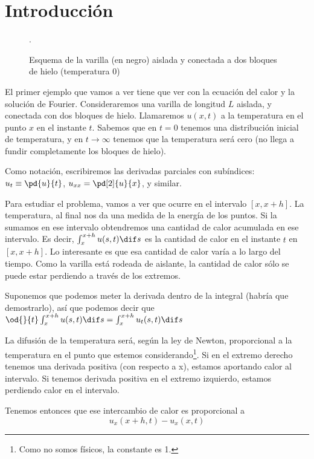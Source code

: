 \chapter{Introducción}

\begin{figure}[hbtp]
\centering
{}
\caption{Esquema de la varilla (en negro) aislada y conectada a dos bloques de hielo (temperatura 0)}.
\label{fig:TransmisionCalor}
\end{figure}

El primer ejemplo que vamos a ver tiene que ver con la ecuación del calor y la solución de Fourier. Consideraremos una varilla de longitud $L$ aislada, y conectada con dos bloques de hielo. Llamaremos $u(x,t)$ a la temperatura en el punto $x$ en el instante $t$. Sabemos que en $t = 0$ tenemos una distribución inicial de temperatura, y en $t \to ∞$ tenemos que la temperatura será cero (no llega a fundir completamente los bloques de hielo).

Como notación, escribiremos las derivadas parciales con subíndices: $u_t \equiv \pd{u}{t}$, $u_{xx} = \pd[2]{u}{x}$, y similar.

Para estudiar el problema, vamos a ver que ocurre en el intervalo $[x, x+h]$. La temperatura, al final nos da una medida de la energía de los puntos. Si la sumamos en ese intervalo obtendremos una cantidad de calor acumulada en ese intervalo. Es decir, $\int_x^{x+h} u(s,t) \dif s$ es la cantidad de calor en el instante $t$ en $[x,x+h]$. Lo interesante es que esa cantidad de calor varía a lo largo del tiempo. Como la varilla está rodeada de aislante, la cantidad de calor sólo se puede estar perdiendo a través de los extremos.

Suponemos que podemos meter la derivada dentro de la integral (habría que demostrarlo), así que podemos decir que \(  \od{}{t} \int_x^{x+h} u(s,t) \dif s = \int_x^{x+h} u_t(s,t) \dif s \label{eq:intro_1}\)

La difusión de la temperatura será, según la ley de Newton, proporcional a la temperatura en el punto que estemos considerando\footnote{Como no somos físicos, la constante es 1.}. Si en el extremo derecho tenemos una derivada positiva (con respecto a x), estamos aportando calor al intervalo. Si tenemos derivada positiva en el extremo izquierdo, estamos perdiendo calor en el intervalo.

Tenemos entonces que ese intercambio de calor es proporcional a \[u_x(x+h, t) - u_x(x,t)\]

